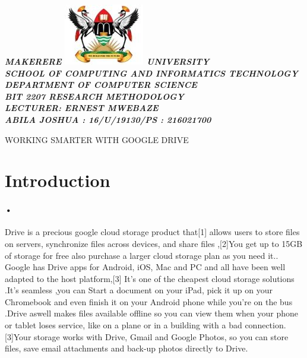 \documentclass[11pt]{article}
\begin{document}
\begin{center}
\begin{normalsize}
\textbf\sl{MAKERERE \includegraphics[scale=0.5]{logo} UNIVERSITY }\\

\textbf\sl{SCHOOL OF COMPUTING AND INFORMATICS TECHNOLOGY} \\
\textbf\sl{DEPARTMENT OF COMPUTER SCIENCE} \\
\textbf\sl{BIT 2207 RESEARCH METHODOLOGY} \\
\textbf\sl{LECTURER: ERNEST MWEBAZE} \\
\textbf\sl{ABILA JOSHUA : 16/U/19130/PS : 216021700}\\

\newpage


\textsc{WORKING SMARTER WITH GOOGLE DRIVE }\\ 

\end{normalsize}
\end{center}

\section{Introduction}
\paragraph{•}
Drive is a precious google cloud storage product that[1] allows users to store files on servers, synchronize files across devices, and share files ,[2]You get up to 15GB of storage for free also purchase a larger cloud storage plan as you need it.. Google has Drive apps for Android, iOS, Mac and PC and all have been well adapted to the host platform,[3] It’s  one of the cheapest cloud storage solutions .It’s seamless ,you can Start a document on your iPad, pick it up on your Chromebook and even finish it on your Android phone while you’re on the bus .Drive aswell makes files available offline so you can view them when your phone or tablet loses service, like on a plane or in a building with a bad connection.[3]Your storage works with Drive, Gmail and Google Photos, so you can store files, save email attachments and back-up photos directly to Drive.
\end{document}
